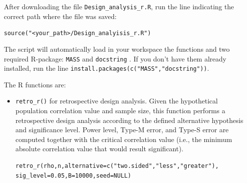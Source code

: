 \documentclass{article}\usepackage[]{graphicx}\usepackage[]{color}
\makeatletter
\newcommand{\hlnum}[1]{\textcolor[rgb]{0.063,0.58,0.627}{#1}}%
\newcommand{\hlstr}[1]{\textcolor[rgb]{0.063,0.58,0.627}{#1}}%
\newcommand{\hlstd}[1]{\textcolor[rgb]{0.196,0.196,0.196}{#1}}%
\newcommand{\hlkwa}[1]{\textcolor[rgb]{0.231,0.416,0.784}{#1}}%
\newcommand{\hlkwc}[1]{\textcolor[rgb]{0,0.631,0.314}{#1}}%
\newcommand{\hlkwd}[1]{\textcolor[rgb]{0.78,0.227,0.412}{#1}}%
\newenvironment{kframe}{%
 \def\at@end@of@kframe{}%
 \ifinner\ifhmode%
  \def\at@end@of@kframe{\end{minipage}}%
  \begin{minipage}{\columnwidth}%
 \fi\fi%
 \def\FrameCommand##1{\hskip\@totalleftmargin \hskip-\fboxsep
 \colorbox{shadecolor}{##1}\hskip-\fboxsep
     \hskip-\linewidth \hskip-\@totalleftmargin \hskip\columnwidth}%
 \MakeFramed {\advance\hsize-\width
   \@totalleftmargin\z@ \linewidth\hsize
   \@setminipage}}%
 {\par\unskip\endMakeFramed%
 \at@end@of@kframe}
\newenvironment{knitrout}{}{} %
\makeatother
\begin{document}
\begin{refsection}
After downloading the file \texttt{Design\_analysis\_r.R}, run the line indicating the correct path where the file was saved:
\begin{knitrout}
\color{fgcolor}\begin{kframe}
\begin{alltt}
\hlkwd{source}\hlstd{(}\hlstr{"<your_path>/Design_analyisis_r.R"}\hlstd{)}
\end{alltt}
\end{kframe}
\end{knitrout}
The script will automatically load in your workspace the functions and two required R-package: \texttt{MASS} \parencite{venablesModernAppliedStatistics2002} and \texttt{docstring} \textcite{kurkiewiczDocstringProvidesDocstring2017}. If you don't have them already installed, run the line \texttt{install.packages(c("MASS","docstring"))}.

The R functions are:
\begin{itemize}
\item{\texttt{retro\_r()} for retrospective design analysis. Given the hypothetical population correlation value and sample size, this function performs a retrospective design analysis according to the defined alternative hypothesis and significance level. Power level, Type-M error, and Type-S error are computed together with the critical correlation value (i.e., the minimum absolute correlation value that would result significant).}
\begin{knitrout}
\color{fgcolor}\begin{kframe}
\begin{alltt}
\hlkwd{retro_r}\hlstd{(rho, n,} \hlkwc{alternative} \hlstd{=} \hlkwd{c}\hlstd{(}\hlstr{"two.sided"}\hlstd{,} \hlstr{"less"}\hlstd{,} \hlstr{"greater"}\hlstd{),}
    \hlkwc{sig_level} \hlstd{=} \hlnum{0.05}\hlstd{,} \hlkwc{B} \hlstd{=} \hlnum{10000}\hlstd{,} \hlkwc{seed} \hlstd{=} \hlkwa{NULL}\hlstd{)}
\end{alltt}
\end{kframe}
\end{knitrout}


\end{itemize}
\end{refsection}
\end{document}
